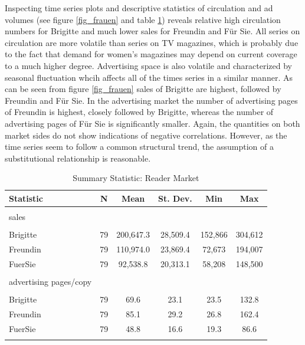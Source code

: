 \documentclass[12pt,a4paper,notitlepage]{article}
\begin{document}
Inspecting time series plots and descriptive statistics of circulation and ad volumes (see figure \ref{fig_frauen} and table \ref{table_frauen}) reveals relative high circulation numbers for Brigitte and much lower sales for Freundin and Für Sie. All series on circulation are more volatile than series on TV magazines, which is probably due to the fact that demand for women's magazines may depend on current coverage to a much higher degree. Advertising space is also volatile and characterized by seasonal fluctuation whcih affects all of the times series in a similar manner.  As can be seen from figure \ref{fig_frauen} sales of Brigitte are highest, followed by Freundin and Für Sie. In the advertising market the number of advertising pages of Freundin is highest, closely followed by Brigitte, whereas the number of advertising pages of Für Sie is significantly smaller. Again, the quantities on both market sides do not show indications of negative correlations. However, as the time series seem to follow a common structural trend, the assumption of a substitutional relationship is reasonable. 


%	
%	


\begin{table}[!htbp] \centering 
  \caption{Summary Statistic: Reader Market} 
  \label{table_frauen} 
\begin{tabular}{@{\extracolsep{5pt}}lccccc} 
\\[-1.8ex]\hline  
Statistic & \multicolumn{1}{c}{N} & \multicolumn{1}{c}{Mean} & \multicolumn{1}{c}{St. Dev.} & \multicolumn{1}{c}{Min} & \multicolumn{1}{c}{Max} \\ 
\hline \\[-1.8ex] 
sales \\
\hline \\[-1.8ex]
Brigitte & 79 & 200,647.3 & 28,509.4 & 152,866 & 304,612 \\ 
Freundin & 79 & 110,974.0 & 23,869.4 & 72,673 & 194,007 \\ 
FuerSie & 79 & 92,538.8 & 20,313.1 & 58,208 & 148,500 \\ 
\hline \\[-1.8ex] 
advertising pages/copy \\
\hline \\[-1.8ex] 
Brigitte & 79 & 69.6 & 23.1 & 23.5 & 132.8 \\ 
Freundin & 79 & 85.1 & 29.2 & 26.8 & 162.4 \\ 
FuerSie & 79 & 48.8 & 16.6 & 19.3 & 86.6 \\ 
\hline \\[-1.8ex] 
\end{tabular} 
\end{table}  
\end{document}
